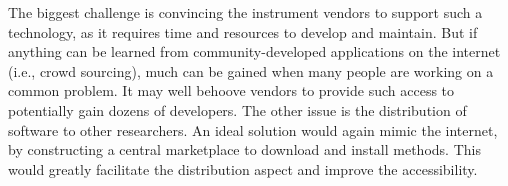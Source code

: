 The biggest challenge is convincing the instrument vendors to support such a technology, as it requires time and resources to develop and maintain. But if anything can be learned from community-developed applications on the internet (i.e., crowd sourcing), much can be gained when many people are working on a common problem. It may well behoove vendors to provide such access to potentially gain dozens of developers. The other issue is the distribution of software to other researchers. An ideal solution would again mimic the internet, by constructing a central marketplace to download and install methods. This would greatly facilitate the distribution aspect and improve the accessibility.

